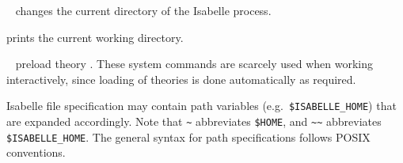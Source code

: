 \begin{isabellebody}
\begin{isamarkuptext}
  \begin{description}

  \item \hyperlink{command.cd}{\mbox{}}~ changes the current directory
  of the Isabelle process.

  \item \hyperlink{command.pwd}{\mbox{}} prints the current working directory.

  \item \hyperlink{command.use-thy}{\mbox{}}~ preload theory .
  These system commands are scarcely used when working interactively,
  since loading of theories is done automatically as required.

  \end{description}

  Isabelle file specification may contain path variables (e.g.\
  \verb|$ISABELLE_HOME|) that are expanded accordingly.  Note
  that \verb|~| abbreviates \verb|$HOME|, and \verb|~~| abbreviates \verb|$ISABELLE_HOME|.  The general syntax
  for path specifications follows POSIX conventions.%
\end{isamarkuptext}%
\isamarkuptrue%
%
\isadelimtheory
%
\endisadelimtheory
%
\isatagtheory
{}\isamarkupfalse%
%
\endisatagtheory
{\isafoldtheory}%
%
\isadelimtheory
%
\endisadelimtheory
\isanewline
\end{isabellebody}%
